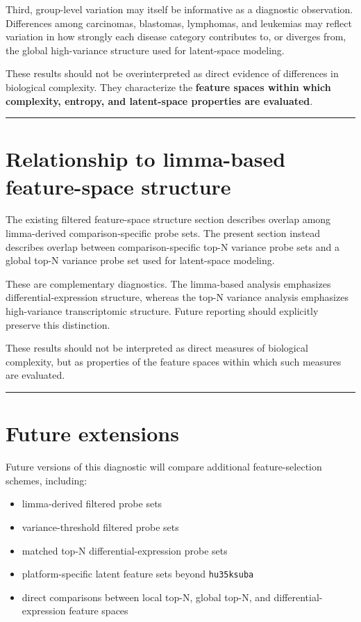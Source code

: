 \documentclass[
  letterpaper,
  DIV=11,
  numbers=noendperiod,
  openany,
  oneside]{scrreprt}
\providecommand{\tightlist}{%
  \setlength{\itemsep}{0pt}\setlength{\parskip}{0pt}}
\begin{document}
Third, group-level variation may itself be informative as a diagnostic
observation. Differences among carcinomas, blastomas, lymphomas, and
leukemias may reflect variation in how strongly each disease category
contributes to, or diverges from, the global high-variance structure
used for latent-space modeling.

These results should not be overinterpreted as direct evidence of
differences in biological complexity. They characterize the
\textbf{feature spaces within which complexity, entropy, and
latent-space properties are evaluated}.

\begin{center}\rule{0.5\linewidth}{0.5pt}\end{center}

\section{Relationship to limma-based feature-space
structure}\label{relationship-to-limma-based-feature-space-structure}

The existing filtered feature-space structure section describes overlap
among limma-derived comparison-specific probe sets. The present section
instead describes overlap between comparison-specific top-N variance
probe sets and a global top-N variance probe set used for latent-space
modeling.

These are complementary diagnostics. The limma-based analysis emphasizes
differential-expression structure, whereas the top-N variance analysis
emphasizes high-variance transcriptomic structure. Future reporting
should explicitly preserve this distinction.

These results should not be interpreted as direct measures of biological
complexity, but as properties of the feature spaces within which such
measures are evaluated.

\begin{center}\rule{0.5\linewidth}{0.5pt}\end{center}

\section{Future extensions}\label{future-extensions}

Future versions of this diagnostic will compare additional
feature-selection schemes, including:

\begin{itemize}
\tightlist
\item
  limma-derived filtered probe sets
\item
  variance-threshold filtered probe sets
\item
  matched top-N differential-expression probe sets
\item
  platform-specific latent feature sets beyond \texttt{hu35ksuba}
\item
  direct comparisons between local top-N, global top-N, and
  differential-expression feature spaces
\end{itemize}
\end{document}
